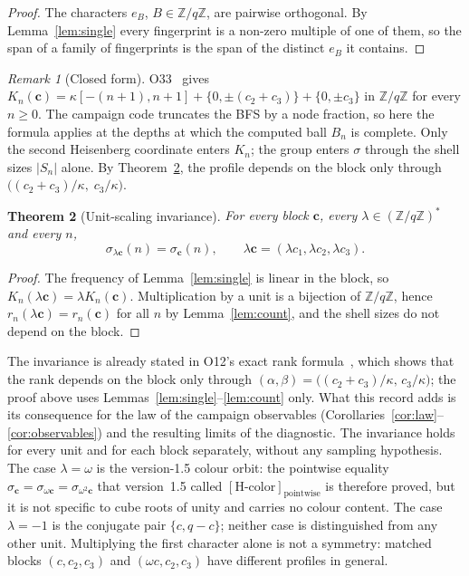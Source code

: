\documentclass[12pt,a4paper]{article}
\newtheorem{theorem}{Theorem}
\theoremstyle{definition}
\theoremstyle{remark}
\newtheorem{remark}[theorem]{Remark}
\newcommand{\Zq}{\mathbb{Z}/q\mathbb{Z}}
\newcommand{\Zqs}{(\mathbb{Z}/q\mathbb{Z})^{*}}
\newcommand{\Hcolor}{[\mathrm{H\text{-}color}]}
\begin{document}
  \begin{proof}
    The characters $e_B$, $B\in\Zq$, are pairwise orthogonal.
    By Lemma~\ref{lem:single} every fingerprint is a non-zero multiple of one of them, so the
    span of a family of fingerprints is the span of the distinct $e_B$ it contains.
  \end{proof}

  \begin{remark}[Closed form]
    \label{rmk:closed}
    O33~\cite[Theorem~3.1]{Beau2026a37} gives
    $K_n(\mathbf c)=\kappa[-(n+1),n+1]+\{0,\pm(c_2+c_3)\}+\{0,\pm c_3\}$ in $\Zq$ for every $n\geq0$.
    The campaign code truncates the BFS by a node fraction, so here the formula applies at the depths
    at which the computed ball $B_n$ is complete.
    Only the second Heisenberg coordinate enters $K_n$; the group enters $\sigma$ through the
    shell sizes $|S_n|$ alone.
    By Theorem~\ref{thm:invariance}, the profile depends on the block only through
    $\bigl((c_2+c_3)/\kappa,\;c_3/\kappa\bigr)$.
  \end{remark}

  \begin{theorem}[Unit-scaling invariance]
    \label{thm:invariance}
    For every block $\mathbf c$, every $\lambda\in\Zqs$ and every $n$,
    \[
      \sigma_{\lambda\mathbf c}(n)=\sigma_{\mathbf c}(n),
      \qquad \lambda\mathbf c=(\lambda c_1,\lambda c_2,\lambda c_3).
    \]
  \end{theorem}

  \begin{proof}
    The frequency of Lemma~\ref{lem:single} is linear in the block, so
    $K_n(\lambda\mathbf c)=\lambda K_n(\mathbf c)$.
    Multiplication by a unit is a bijection of $\Zq$, hence
    $r_n(\lambda\mathbf c)=r_n(\mathbf c)$ for all $n$ by Lemma~\ref{lem:count}, and the
    shell sizes do not depend on the block.
  \end{proof}

  The invariance is already stated in O12's exact rank formula~\cite{Beau2026a16}, which shows that
  the rank depends on the block only through $(\alpha,\beta)=\bigl((c_2+c_3)/\kappa,\,c_3/\kappa\bigr)$;
  the proof above uses Lemmas~\ref{lem:single}--\ref{lem:count} only.
  What this record adds is its consequence for the law of the campaign observables
  (Corollaries~\ref{cor:law}--\ref{cor:observables}) and the resulting limits of the diagnostic.
  The invariance holds for every unit and for each block separately, without any sampling
  hypothesis.
  The case $\lambda=\omega$ is the version-1.5 colour orbit: the pointwise equality
  $\sigma_{\mathbf c}=\sigma_{\omega\mathbf c}=\sigma_{\omega^2\mathbf c}$ that version~1.5 called
  $\Hcolor_{\mathrm{pointwise}}$ is therefore proved, but it is not specific to cube roots of unity
  and carries no colour content.
  The case $\lambda=-1$ is the conjugate pair $\{c,q-c\}$; neither case is distinguished from any
  other unit.
  Multiplying the first character alone is not a symmetry: matched blocks
  $(c,c_2,c_3)$ and $(\omega c,c_2,c_3)$ have different profiles in general.
\end{document}
